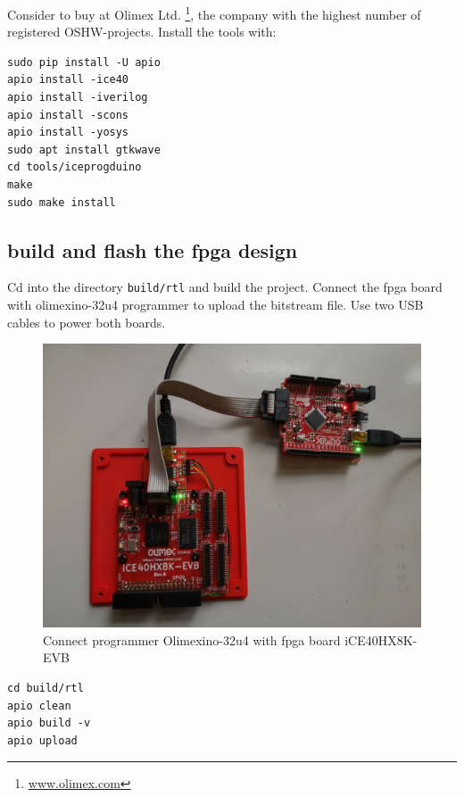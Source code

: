 \documentclass[a4paper,ngerman]{scrartcl}
\begin{document}
Consider to buy at Olimex Ltd. \footnote{\href{www.olimex.com}{www.olimex.com}}, the company with the highest number of registered OSHW-projects. Install the tools with:

\begin{lstlisting}[numbers=none,frame=none]
sudo pip install -U apio
apio install -ice40
apio install -iverilog
apio install -scons
apio install -yosys
sudo apt install gtkwave
cd tools/iceprogduino
make
sudo make install
\end{lstlisting}

\subsection{build and flash the fpga design}

Cd into the directory \lstinline|build/rtl| and build the project. Connect the fpga board with olimexino-32u4 programmer to upload the bitstream file. Use two USB cables to power both boards.

\begin{figure}[H]
	\centering
	\includegraphics[width=0.6\linewidth]{../MIX_flash.jpg}
	\caption{Connect programmer Olimexino-32u4 with fpga board iCE40HX8K-EVB}
	\label{fig:flash}
\end{figure}


\begin{lstlisting}[numbers=none,frame=none]
cd build/rtl
apio clean
apio build -v
apio upload
\end{lstlisting}
\end{document}
